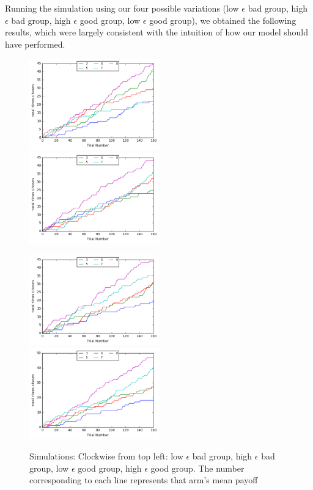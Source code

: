 \documentclass[11pt, a4paper]{article}
\begin{document}
Running the simulation using our four possible variations (low $\epsilon$ bad group, high $\epsilon$ bad group, high $\epsilon$ good group, low $\epsilon$ good group), we obtained the following results, which were largely consistent with the intuition of how our model should have performed.

\begin{figure}[h]
\centerline{%
\includegraphics[width=0.5\textwidth]{low_beta_bad_group}%
\includegraphics[width=0.5\textwidth]{high_beta_bad_group}%
}%
\centerline{%
\includegraphics[width=0.5\textwidth] {high_beta_good_group}%
\includegraphics[width=0.5\textwidth] {low_beta_good_grou}%
}%
\caption{Simulations: Clockwise from top left: low $\epsilon$ bad group, high $\epsilon$ bad group, low $\epsilon$ good group, high $\epsilon$ good group. The number corresponding to each line represents that arm's mean payoff}
\end{figure}
\end{document}
